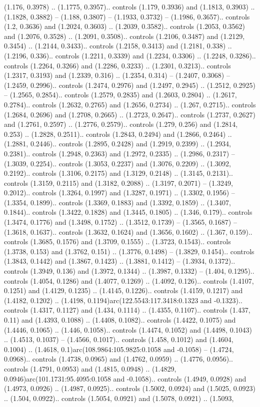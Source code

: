 (1.176, 0.3978) .. (1.1775, 0.3957).. controls (1.179, 0.3936) and (1.1813, 0.3903) .. (1.1828, 0.3882) -- (1.188, 0.3807) -- (1.1933, 0.3732) -- (1.1986, 0.3657).. controls (1.2, 0.3636) and (1.2024, 0.3603) .. (1.2039, 0.3582).. controls (1.2053, 0.3562) and (1.2076, 0.3528) .. (1.2091, 0.3508).. controls (1.2106, 0.3487) and (1.2129, 0.3454) .. (1.2144, 0.3433).. controls (1.2158, 0.3413) and (1.2181, 0.338) .. (1.2196, 0.336).. controls (1.2211, 0.3339) and (1.2234, 0.3306) .. (1.2248, 0.3286).. controls (1.2264, 0.3266) and (1.2286, 0.3233) .. (1.2301, 0.3213).. controls (1.2317, 0.3193) and (1.2339, 0.316) .. (1.2354, 0.314) -- (1.2407, 0.3068) -- (1.2459, 0.2996).. controls (1.2474, 0.2976) and (1.2497, 0.2945) .. (1.2512, 0.2925) -- (1.2565, 0.2854).. controls (1.2579, 0.2835) and (1.2603, 0.2804) .. (1.2617, 0.2784).. controls (1.2632, 0.2765) and (1.2656, 0.2734) .. (1.267, 0.2715).. controls (1.2684, 0.2696) and (1.2708, 0.2665) .. (1.2723, 0.2647).. controls (1.2737, 0.2627) and (1.2761, 0.2597) .. (1.2776, 0.2579).. controls (1.279, 0.256) and (1.2814, 0.253) .. (1.2828, 0.2511).. controls (1.2843, 0.2494) and (1.2866, 0.2464) .. (1.2881, 0.2446).. controls (1.2895, 0.2428) and (1.2919, 0.2399) .. (1.2934, 0.2381).. controls (1.2948, 0.2363) and (1.2972, 0.2335) .. (1.2986, 0.2317) -- (1.3039, 0.2254).. controls (1.3053, 0.2237) and (1.3076, 0.2209) .. (1.3092, 0.2192).. controls (1.3106, 0.2175) and (1.3129, 0.2148) .. (1.3145, 0.2131).. controls (1.3159, 0.2115) and (1.3182, 0.2088) .. (1.3197, 0.2071) -- (1.3249, 0.2012).. controls (1.3264, 0.1997) and (1.3287, 0.1971) .. (1.3302, 0.1956) -- (1.3354, 0.1899).. controls (1.3369, 0.1883) and (1.3392, 0.1859) .. (1.3407, 0.1844).. controls (1.3422, 0.1828) and (1.3445, 0.1805) .. (1.346, 0.179).. controls (1.3474, 0.1776) and (1.3498, 0.1752) .. (1.3512, 0.1739) -- (1.3565, 0.1687) -- (1.3618, 0.1637).. controls (1.3632, 0.1624) and (1.3656, 0.1602) .. (1.367, 0.159).. controls (1.3685, 0.1576) and (1.3709, 0.1555) .. (1.3723, 0.1543).. controls (1.3738, 0.153) and (1.3762, 0.151) .. (1.3776, 0.1498) -- (1.3829, 0.1454).. controls (1.3843, 0.1442) and (1.3867, 0.1423) .. (1.3881, 0.1412) -- (1.3934, 0.1372).. controls (1.3949, 0.136) and (1.3972, 0.1344) .. (1.3987, 0.1332) -- (1.404, 0.1295).. controls (1.4054, 0.1286) and (1.4077, 0.1269) .. (1.4092, 0.126).. controls (1.4107, 0.1251) and (1.4129, 0.1235) .. (1.4145, 0.1226).. controls (1.4159, 0.1217) and (1.4182, 0.1202) .. (1.4198, 0.1194)arc(122.5543:117.3418:0.1323 and -0.1323).. controls (1.4317, 0.1127) and (1.434, 0.1114) .. (1.4355, 0.1107).. controls (1.437, 0.11) and (1.4393, 0.1088) .. (1.4408, 0.1082).. controls (1.4422, 0.1075) and (1.4446, 0.1065) .. (1.446, 0.1058).. controls (1.4474, 0.1052) and (1.4498, 0.1043) .. (1.4513, 0.1037) -- (1.4566, 0.1017).. controls (1.458, 0.1012) and (1.4604, 0.1004) .. (1.4618, 0.1)arc(108.9864:105.9825:0.1058 and -0.1058) -- (1.4724, 0.0968).. controls (1.4738, 0.0965) and (1.4762, 0.0959) .. (1.4776, 0.0956).. controls (1.4791, 0.0953) and (1.4815, 0.0948) .. (1.4829, 0.0946)arc(101.1731:95.4095:0.1058 and -0.1058).. controls (1.4949, 0.0928) and (1.4973, 0.0926) .. (1.4987, 0.0925).. controls (1.5002, 0.0924) and (1.5025, 0.0923) .. (1.504, 0.0922).. controls (1.5054, 0.0921) and (1.5078, 0.0921) .. (1.5093, 